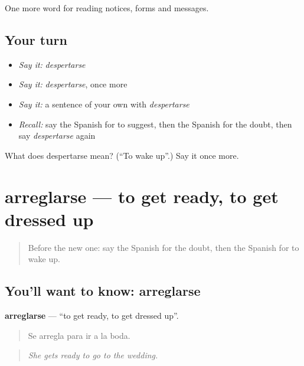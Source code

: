 \begin{grammarlens}[title={What you've built}]
One more word for reading notices, forms and messages.
\end{grammarlens}

\subsection*{Your turn}
\begin{itemize}
\raggedright
  \item \emph{Say it:} \emph{despertarse}
  \item \emph{Say it:} \emph{despertarse}, once more
  \item \emph{Say it:} a sentence of your own with \emph{despertarse}
  \item \emph{Recall:} say the Spanish for to suggest, then the Spanish for the doubt, then say \emph{despertarse} again
\end{itemize}

\begin{tcolorbox}[breakable,colback=teal!4,colframe=teal!35!black,title={Before you move on}]
What does despertarse mean? (\textquotedblleft{}To wake up\textquotedblright{}.) Say it once more.
\end{tcolorbox}
\section[arreglarse]{arreglarse — to get ready, to get dressed up}

\label{lesson:ES-C494-arreglarse}



\begin{quote}
Before the new one: say the Spanish for the doubt, then the Spanish for to wake up.
\end{quote}

\subsection*{You'll want to know: arreglarse}
\textbf{arreglarse} — \textquotedblleft{}to get ready, to get dressed up\textquotedblright{}.

\begin{quote}
Se arregla para ir a la boda.
\end{quote}

\begin{quote}
\emph{She gets ready to go to the wedding.}
\end{quote}

